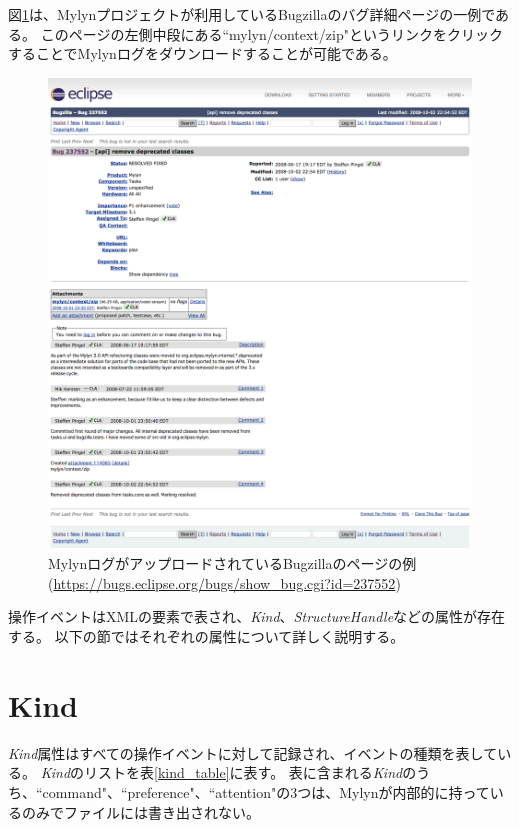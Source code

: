 \documentclass[a4paper]{jsbook}
\begin{document}
図\ref{bugzilla_webpage}は、Mylynプロジェクトが利用しているBugzillaのバグ詳細ページの一例である。
このページの左側中段にある``mylyn/context/zip"というリンクをクリックすることでMylynログをダウンロードすることが可能である。

\begin{figure}[tb]
  \centering
  \includegraphics[width = \linewidth]{resource/bugzilla_webpage.png}
  \caption{MylynログがアップロードされているBugzillaのページの例 (\url{https://bugs.eclipse.org/bugs/show_bug.cgi?id=237552})}
  \label{bugzilla_webpage}
\end{figure}


操作イベントはXMLの要素で表され、{\it Kind}、{\it StructureHandle}などの属性が存在する。
以下の節ではそれぞれの属性について詳しく説明する。

\section{Kind}\label{kind_sec}
{\it Kind}属性はすべての操作イベントに対して記録され、イベントの種類を表している。
{\it Kind}のリストを表\ref{kind_table}に表す。
表に含まれる{\it Kind}のうち、``command"、``preference"、``attention"の3つは、Mylynが内部的に持っているのみでファイルには書き出されない。
\end{document}
